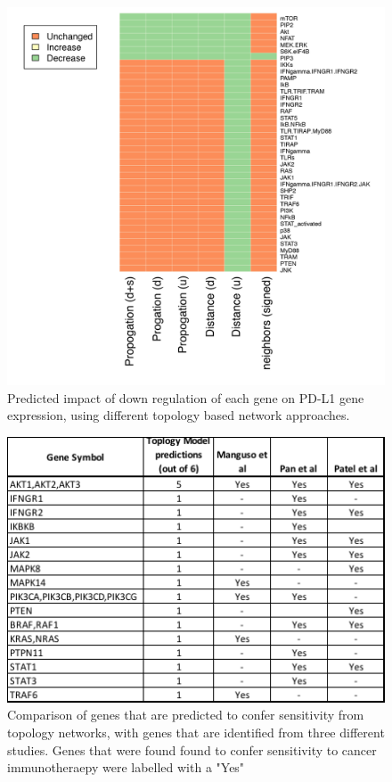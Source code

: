\documentclass{article}
\begin{document}
\begin{figure}
    \centering
    \includegraphics[scale = 0.8]{Images/heatmap_clean-01.png}
    \caption{Predicted impact of down regulation of each gene on PD-L1 gene expression, using different topology based network approaches.}
    \label{fig:heatmap}
\end{figure}


\begin{figure}
    \centering
    \includegraphics[scale = 0.8]{Images/ComparisonHits.png}
    \caption{Comparison of genes that are predicted to confer sensitivity from topology networks, with genes that are identified from three different studies. Genes that were found found to confer sensitivity to cancer immunotheraepy were labelled with a "Yes"}
    \label{fig:comparisonHits}
\end{figure}
\end{document}
